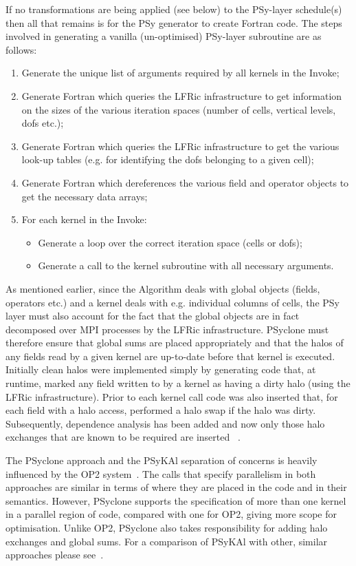 \documentclass[times]{elsarticle}
\begin{document}
If no transformations are being applied (see below) to the PSy-layer
schedule(s) then all that remains is for the PSy generator to create
Fortran code.  The steps involved in generating a vanilla
(un-optimised) PSy-layer subroutine are as follows:
\begin{enumerate}
\item Generate the unique list of arguments required by all kernels
  in the Invoke;
\item Generate Fortran which queries the LFRic infrastructure to get
  information on the sizes of the various iteration spaces (number of cells,
  vertical levels, dofs etc.);
\item Generate Fortran which queries the LFRic infrastructure to get the
  various look-up tables (e.g. for identifying the dofs belonging to a
  given cell);
\item Generate Fortran which dereferences the various field and operator
  objects to get the necessary data arrays;
\item For each kernel in the Invoke:
  \begin{itemize}
    \item Generate a loop over the correct iteration space (cells or dofs);
    \item Generate a call to the kernel subroutine with all necessary arguments.
  \end{itemize}
\end{enumerate}

As mentioned earlier, since the Algorithm deals with global objects
(fields, operators etc.)  and a kernel deals with e.g. individual
columns of cells, the PSy layer must also account for the fact that
the global objects are in fact decomposed over MPI processes by the
LFRic infrastructure. PSyclone must therefore ensure that global sums
are placed appropriately and that the halos of any fields read by a
given kernel are up-to-date before that kernel is executed. Initially
clean halos were implemented simply by generating code that, at
runtime, marked any field written to by a kernel as having a dirty
halo (using the LFRic infrastructure). Prior to each kernel call code
was also inserted that, for each field with a halo access, performed a
halo swap if the halo was dirty. Subsequently, dependence analysis has
been added and now only those halo exchanges that are known to be
required are inserted ~\cite{psyclone}.

The PSyclone approach and the {PS}y{KA}l separation of concerns is
heavily influenced by the OP2 system~\citep{OP2, PYOP2}. The calls
that specify parallelism in both approaches are similar in terms of
where they are placed in the code and in their semantics. However,
PSyclone supports the specification of more than one kernel in a
parallel region of code, compared with one for OP2, giving more scope
for optimisation. Unlike OP2, PSyclone also takes responsibility for
adding halo exchanges and global sums. For a comparison of {PS}y{KA}l
with other, similar approaches please see~\cite{nemolite2d_psykal}.
\end{document}
